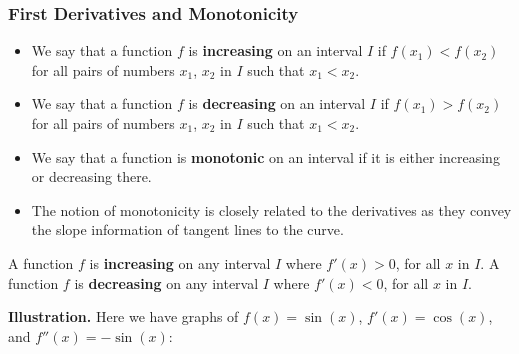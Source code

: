 \documentclass[10pt,t,presentation,ignorenonframetext,aspectratio=169]{beamer}
\begin{document}
\begin{frame}
  \frametitle{First Derivatives and Monotonicity}
  \begin{defn}[Monotonicity]
    \begin{itemize}
    \item We say that a function $f$ is \textbf{increasing} on an
      interval $I$ if $f(x_{1})<f(x_{2})$ for all pairs of numbers
      $x_{1}$, $x_{2}$ in $I$ such that $x_{1}<x_{2}$.
    \item We say that a function $f$ is \textbf{decreasing} on an
      interval $I$ if $f(x_{1})>f(x_{2})$ for all pairs of numbers
      $x_{1}$, $x_{2}$ in $I$ such that $x_{1}<x_{2}$.
    \end{itemize}
  \end{defn}

  \begin{itemize}
  \item We say that a function is \textbf{monotonic} on an interval if
    it is either increasing or decreasing there.
  \item The notion of monotonicity is closely related to the
    derivatives as they convey the slope information of tangent lines
    to the curve.
  \end{itemize}
\end{frame}

\begin{frame}
  \vs{}
  \begin{thm}
    A function $f$ is \textbf{increasing} on any interval $I$ where
    $f'(x)>0$, for all $x$ in $I$. A function $f$ is
    \textbf{decreasing} on any interval $I$ where $f'(x)<0$, for all
    $x$ in $I$.
  \end{thm}
  \vfill

  \textbf{Illustration.}
  Here we have graphs of $f(x) = \sin(x)$, $f'(x) = \cos(x)$, and
  $f''(x) = -\sin(x)$:
  \begin{image}[0.8\textwidth]
  \end{image}
\end{frame}
\end{document}
